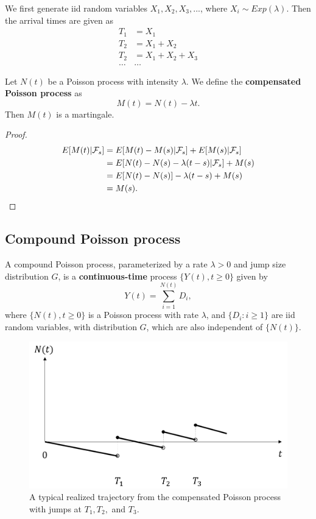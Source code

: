 \begin{refsection}
\begin{mdframed}
	\begin{remark}
		We first generate iid random variables $X_1,X_2,X_3,...$, where $X_i\sim Exp(\lambda)$. Then the arrival times are given as
		\begin{align*}
		T_1 &= X_1 \\
		T_2 & = X_1 +X_2\\
		T_2 & = X_1 +X_2 + X_3\\
		\dots & \dots
		\end{align*}	
	\end{remark}
\end{mdframed}

\begin{lemma}\cite[468]{shreve2004stochastic2}
	Let $N(t)$ be a Poisson process with intensity $\lambda$. We define the \textbf{compensated Poisson process} as $$M(t) = N(t) - \lambda t.$$
	Then $M(t)$ is a martingale.
\end{lemma}
\begin{proof}
	\begin{align*}
	E[M(t)|\mathcal{F}_s] &= E[M(t)-M(s)|\mathcal{F}_s] + E[M(s)|\mathcal{F}_s]\\
	&= E[N(t) - N(s) -\lambda(t-s)|\mathcal{F}_s] + M(s)\\
	&= E[N(t) - N(s)] -\lambda(t-s) + M(s) \\
	&= M(s).
	\end{align*}
\end{proof}


\subsection{Compound Poisson process}
\begin{definition}
	A compound Poisson process, parameterized by a rate $\lambda > 0$ and jump size distribution $G$, is a \textbf{continuous-time} process $\{Y(t),t\geq 0\}$ given by
	$$Y(t) = \sum_{i=1}^{N(t)} D_i,$$
	where $\{N(t),t\geq 0\}$ is a Poisson process with rate $\lambda$, and $\{D_i:i\geq 1\}$ are iid random variables, with distribution $G$, which are also independent of $\{N(t)\}$.
\end{definition}


\begin{figure}[H]
\centering
\includegraphics[width=0.7\linewidth]{../figures/stochasticProcess/stochasticProcess/compensatedPoissonProcessTrajectory}
\caption{A typical realized trajectory from the compensated Poisson process with jumps at $T_1,T_2,$ and $T_3$.}
\label{fig:compensatedPoissonProcessTrajectory}
\end{figure}



\end{refsection}
